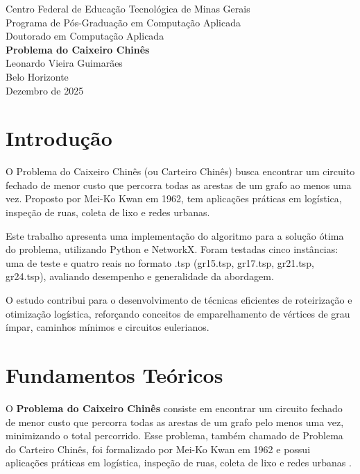 \documentclass[12pt]{article}
\begin{document}
\onehalfspacing
\begin{titlepage}
    \centering
    \vspace*{2cm}
    {\Large Centro Federal de Educação Tecnológica de Minas Gerais}\\[0.7cm]
    {\large Programa de Pós-Graduação em Computação Aplicada}\\[0.5cm]
    {\large Doutorado em Computação Aplicada}\\[2.5cm]
    {\LARGE \textbf{Problema do Caixeiro Chinês}}\\[2.5cm]
    {\large Leonardo Vieira Guimarães}\\[5.5cm]
    {\large Belo Horizonte}\\[0.3cm]
    {\large Dezembro de 2025}
    \vspace*{2cm}
\end{titlepage}
\setcounter{page}{1}

\section{Introdução}


O Problema do Caixeiro Chinês (ou Carteiro Chinês) busca encontrar um circuito fechado de menor custo que percorra todas as arestas de um grafo ao menos uma vez. Proposto por Mei-Ko Kwan em 1962, tem aplicações práticas em logística, inspeção de ruas, coleta de lixo e redes urbanas.

Este trabalho apresenta uma implementação do algoritmo para a solução ótima do problema, utilizando Python e NetworkX. Foram testadas cinco instâncias: uma de teste e quatro reais no formato .tsp (gr15.tsp, gr17.tsp, gr21.tsp, gr24.tsp), avaliando desempenho e generalidade da abordagem.

O estudo contribui para o desenvolvimento de técnicas eficientes de roteirização e otimização logística, reforçando conceitos de emparelhamento de vértices de grau ímpar, caminhos mínimos e circuitos eulerianos.

\section{Fundamentos Teóricos}

O \textbf{Problema do Caixeiro Chinês} consiste em encontrar um circuito fechado de menor custo que percorra todas as arestas de um grafo pelo menos uma vez, minimizando o total percorrido. Esse problema, também chamado de Problema do Carteiro Chinês, foi formalizado por Mei-Ko Kwan em 1962 e possui aplicações práticas em logística, inspeção de ruas, coleta de lixo e redes urbanas \cite{boaventura2002grafos,feofiloff2011introduccao}.
\end{document}
